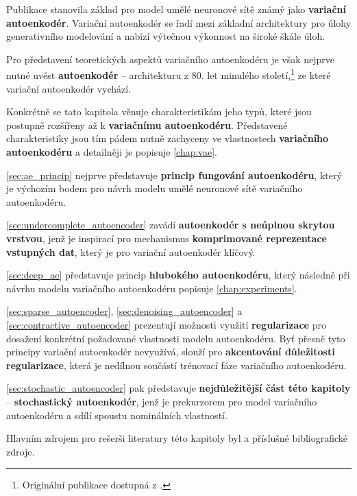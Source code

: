 Publikace \textcite{Kingma2014} stanovila základ pro model umělé neuronové sítě známý jako \textbf{variační autoenkodér}.
Variační autoenkodér se řadí mezi základní architektury pro úlohy generativního modelování a nabízí výtečnou výkonnost na široké škále úloh. \cite{Kingma2014, Kingma2019}

Pro představení teoretických aspektů variačního autoenkodéru je však nejprve nutné uvést \textbf{autoenkodér} – architekturu z 80. let minulého století,\footnote{Originální publikace dostupná z \textcite{Rumelhart1987}.} ze které variační autoenkodér vychází.

Konkrétně se tato kapitola věnuje charakteristikám jeho typů, které jsou postupně rozšířeny až k \textbf{variačnímu autoenkodéru}.
Představené charakteristiky jsou tím pádem nutně zachyceny ve vlastnostech \textbf{variačního autoenkodéru} a detailněji je popisuje \autoref{chap:vae}.

\autoref{sec:ae_princip} nejprve představuje \textbf{princip fungování autoenkodéru}, který je výchozím bodem pro návrh modelu umělé neuronové sítě variačního autoenkodéru.

\autoref{sec:undercomplete_autoencoder} zavádí \textbf{autoenkodér s neúplnou skrytou vrstvou}, jenž je inspirací pro mechanismus \textbf{komprimované reprezentace vstupných dat}, který je pro variační autoenkodér klíčový.

\autoref{sec:deep_ae} představuje princip \textbf{hlubokého autoenkodéru}, který následně při návrhu modelu variačního autoenkodéru popisuje \autoref{chap:experiments}.

\autoref{sec:sparse_autoencoder}, \autoref{sec:denoising_autoencoder} a \autoref{sec:contractive_autoencoder} prezentují možnosti využití \textbf{regularizace} pro dosažení konkrétní požadované vlastnosti modelu autoenkodéru.
Byť přesně tyto principy variační autoenkodér nevyužívá, slouží pro \textbf{akcentování důležitosti regularizace}, která je nedílnou součástí trénovací fáze variačního autoenkodéru.

\autoref{sec:stochastic_autoencoder} pak představuje \textbf{nejdůležitější část této kapitoly} – \textbf{stochastický autoenkodér}, jenž je prekurzorem pro model variačního autoenkodéru a sdílí spoustu nominálních vlastností.

Hlavním zdrojem pro rešerši literatury této kapitoly byl \textcite{Goodfellow2016} a příslušné bibliografické zdroje.
\newpage